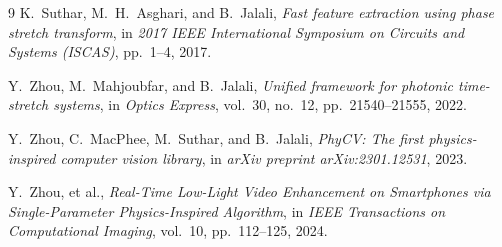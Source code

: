 \documentclass[journal,transmag]{IEEEtran}
\begin{document}
\begin{thebibliography}{9}
K.~Suthar, M.~H.~Asghari, and B.~Jalali, 
\emph{Fast feature extraction using phase stretch transform}, 
in \emph{2017 IEEE International Symposium on Circuits and Systems (ISCAS)}, pp.~1--4, 2017.

Y.~Zhou, M.~Mahjoubfar, and B.~Jalali, 
\emph{Unified framework for photonic time-stretch systems}, 
in \emph{Optics Express}, vol.~30, no.~12, pp.~21540--21555, 2022.

Y.~Zhou, C.~MacPhee, M.~Suthar, and B.~Jalali, 
\emph{PhyCV: The first physics-inspired computer vision library}, 
in \emph{arXiv preprint arXiv:2301.12531}, 2023.

Y.~Zhou, et al., 
\emph{Real-Time Low-Light Video Enhancement on Smartphones via Single-Parameter Physics-Inspired Algorithm}, 
in \emph{IEEE Transactions on Computational Imaging}, vol.~10, pp.~112--125, 2024.

\end{thebibliography}
\end{document}
